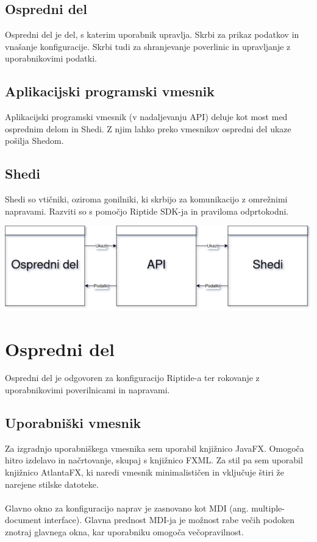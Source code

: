 \documentclass[12pt]{article}
\begin{document}
\subsection{Ospredni del}
Ospredni del je del, s katerim uporabnik upravlja. Skrbi za prikaz podatkov
in vnašanje konfiguracije. Skrbi tudi za shranjevanje poverlinic in
upravljanje z uporabnikovimi podatki.

\subsection{Aplikacijski programski vmesnik}
Aplikacijski programski vmesnik (v nadaljevanju API) deluje kot most med
osprednim delom in Shedi. Z njim lahko preko vmesnikov ospredni del ukaze
pošilja Shedom.

\subsection{Shedi}
Shedi so vtičniki, oziroma gonilniki, ki skrbijo za komunikacijo z 
omrežnimi napravami. Razviti so s pomočjo Riptide SDK-ja in praviloma
odprtokodni.

\begin{center}
	\includegraphics[scale=0.5]{slike/zgradba.png}
\end{center}
\newpage

\section{Ospredni del}
Ospredni del je odgovoren za konfiguracijo Riptide-a ter rokovanje z 
uporabnikovimi poverilnicami in napravami.

\subsection{Uporabniški vmesnik}
Za izgradnjo uporabniškega vmesnika sem uporabil knjižnico JavaFX. Omogoča
hitro izdelavo in načrtovanje, skupaj s knjižnico FXML. Za stil pa sem
uporabil knjižnico AtlantaFX, ki naredi vmesnik minimalističen in vključuje
štiri že narejene stilske datoteke.
\\\\
Glavno okno za konfiguracijo naprav je zasnovano kot MDI (ang.
multiple-document interface). Glavna prednost MDI-ja je možnost rabe večih
podoken znotraj glavnega okna, kar uporabniku omogoča večopravilnost.
\end{document}
